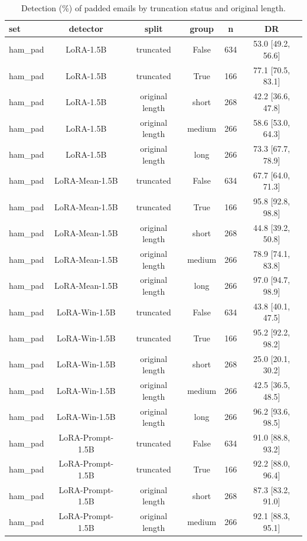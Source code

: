 \begin{table}[t]
\centering
\caption{Detection (\%) of padded emails by truncation status and original length.}
\label{tab:mechanism}
\footnotesize
\begin{tabular}{lccccc}
\toprule
\textbf{set} & \textbf{detector} & \textbf{split} & \textbf{group} & \textbf{n} & \textbf{DR} \\
\midrule
ham\_pad & LoRA-1.5B & truncated & False & 634 & 53.0 [49.2, 56.6] \\
ham\_pad & LoRA-1.5B & truncated & True & 166 & 77.1 [70.5, 83.1] \\
ham\_pad & LoRA-1.5B & original length & short & 268 & 42.2 [36.6, 47.8] \\
ham\_pad & LoRA-1.5B & original length & medium & 266 & 58.6 [53.0, 64.3] \\
ham\_pad & LoRA-1.5B & original length & long & 266 & 73.3 [67.7, 78.9] \\
ham\_pad & LoRA-Mean-1.5B & truncated & False & 634 & 67.7 [64.0, 71.3] \\
ham\_pad & LoRA-Mean-1.5B & truncated & True & 166 & 95.8 [92.8, 98.8] \\
ham\_pad & LoRA-Mean-1.5B & original length & short & 268 & 44.8 [39.2, 50.8] \\
ham\_pad & LoRA-Mean-1.5B & original length & medium & 266 & 78.9 [74.1, 83.8] \\
ham\_pad & LoRA-Mean-1.5B & original length & long & 266 & 97.0 [94.7, 98.9] \\
ham\_pad & LoRA-Win-1.5B & truncated & False & 634 & 43.8 [40.1, 47.5] \\
ham\_pad & LoRA-Win-1.5B & truncated & True & 166 & 95.2 [92.2, 98.2] \\
ham\_pad & LoRA-Win-1.5B & original length & short & 268 & 25.0 [20.1, 30.2] \\
ham\_pad & LoRA-Win-1.5B & original length & medium & 266 & 42.5 [36.5, 48.5] \\
ham\_pad & LoRA-Win-1.5B & original length & long & 266 & 96.2 [93.6, 98.5] \\
ham\_pad & LoRA-Prompt-1.5B & truncated & False & 634 & 91.0 [88.8, 93.2] \\
ham\_pad & LoRA-Prompt-1.5B & truncated & True & 166 & 92.2 [88.0, 96.4] \\
ham\_pad & LoRA-Prompt-1.5B & original length & short & 268 & 87.3 [83.2, 91.0] \\
ham\_pad & LoRA-Prompt-1.5B & original length & medium & 266 & 92.1 [88.3, 95.1] \\

\end{tabular}
\end{table}
